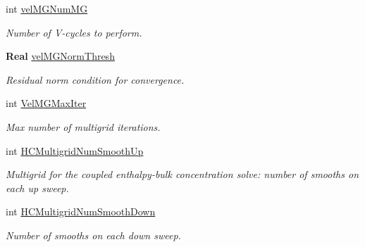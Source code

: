 \begin{DoxyCompactItemize}
\mbox{\label{struct_mushy_layer_options_a7d00e3c60dd7ec9433e5ddf537cdd015}} 
int \hyperlink{struct_mushy_layer_options_a7d00e3c60dd7ec9433e5ddf537cdd015}{vel\+M\+G\+Num\+MG}
\begin{DoxyCompactList}\small\item\em Number of V-\/cycles to perform. \end{DoxyCompactList}\item 
\mbox{\label{struct_mushy_layer_options_aa0022123e27c93fad50f6e821f4dbe7e}} 
\textbf{ Real} \hyperlink{struct_mushy_layer_options_aa0022123e27c93fad50f6e821f4dbe7e}{vel\+M\+G\+Norm\+Thresh}
\begin{DoxyCompactList}\small\item\em Residual norm condition for convergence. \end{DoxyCompactList}\item 
\mbox{\label{struct_mushy_layer_options_ad3bcd2b944b879a864b7ab94cf249973}} 
int \hyperlink{struct_mushy_layer_options_ad3bcd2b944b879a864b7ab94cf249973}{Vel\+M\+G\+Max\+Iter}
\begin{DoxyCompactList}\small\item\em Max number of multigrid iterations. \end{DoxyCompactList}\item 
\mbox{\label{struct_mushy_layer_options_a81979945907672bf45e86cfee26dbca1}} 
int \hyperlink{struct_mushy_layer_options_a81979945907672bf45e86cfee26dbca1}{H\+C\+Multigrid\+Num\+Smooth\+Up}
\begin{DoxyCompactList}\small\item\em Multigrid for the coupled enthalpy-\/bulk concentration solve\+: number of smooths on each up sweep. \end{DoxyCompactList}\item 
\mbox{\label{struct_mushy_layer_options_ac632e3e49a867c4fef77449ced738d40}} 
int \hyperlink{struct_mushy_layer_options_ac632e3e49a867c4fef77449ced738d40}{H\+C\+Multigrid\+Num\+Smooth\+Down}
\begin{DoxyCompactList}\small\item\em Number of smooths on each down sweep. \end{DoxyCompactList}\item 

\end{DoxyCompactItemize}
